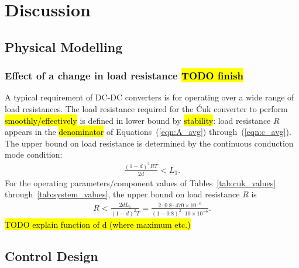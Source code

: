 \section{Discussion}
\subsection{Physical Modelling}
\subsubsection{Effect of a change in load resistance \hl{TODO finish}}\label{sec:varyload}
A typical requirement of DC-DC converters is for operating over a wide range of load resistances. The load resistance required for the \'Cuk converter to perform \hl{smoothly/effectively} is defined in lower bound by \hl{stability}: load resistance $R$ appears in the \hl{denominator} of Equations~(\ref{eqn:A_avg}) through~(\ref{eqn:c_avg}).
\newpar
The upper bound on load resistance is determined by the continuous conduction mode condition:
\begin{align}
\frac{(1 - d)^2 R T}{2 d} < L_1. \label{eqn:conductionmode}
\end{align}
For the operating parameters/component values of Tables~\ref{tab:cuk_values} through~\ref{tab:system_values}, the upper bound on load resistance $R$ is
\begin{align*}
R < \frac{2 d L_1}{(1 - d)^2 T} = \frac{2 \cdot 0.8 \cdot 470 \times 10^{-6}}{(1 - 0.8)^2 \cdot 10 \times 10^{-6}}.
\end{align*}
\hl{TODO explain function of d (where maximum etc.)}
\subsection{Control Design}
